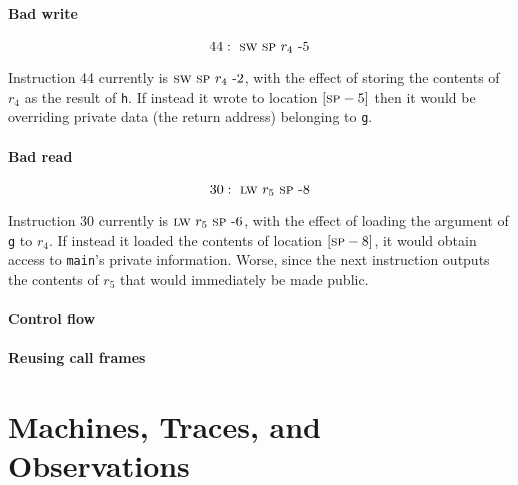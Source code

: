 \documentclass[acmsmall,review,anonymous]{acmart}\settopmatter{printfolios=true,printccs=false,printacmref=false}
\begin{document}


\paragraph*{Bad write}

\[
44 : ~ \textsc{sw} ~ \textsc{sp} ~ r_4 ~ \textrm{-} 5
\]

Instruction 44 currently is $\textsc{sw} ~ \textsc{sp} ~ r_4 ~ \textrm{-} 2$, with the
effect of storing the contents of $r_4$ as the result of {\tt h}. If
instead it wrote to location $[\textsc{sp} - 5]$ then it would be overriding
private data (the return address) belonging to {\tt g}.

\paragraph*{Bad read}

\[
30 : ~ \textsc{lw} ~ r_5 ~ \textsc{sp} ~ \textrm{-} 8
\]

Instruction 30 currently is $\textsc{lw} ~ r_5 ~ \textsc{sp} ~ \textrm{-} 6$, with the
effect of loading the argument of {\tt g} to $r_4$. If instead it
loaded the contents of location $[\textsc{sp} - 8]$, it would obtain access
to {\tt main}'s private information. Worse, since the next instruction
outputs the contents of $r_5$ that would immediately be made public.

\paragraph*{Control flow}


\paragraph*{Reusing call frames}


\section{Machines, Traces, and Observations}
\label{sec:prelim}
\end{document}

